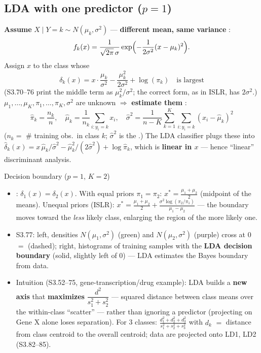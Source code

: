 \subsection{LDA with one predictor ($p=1$)}

\begin{keybox}[LDA, p = 1: model, discriminant function, estimates]
\textbf{Assume} $X\mid Y=k\sim N(\mu_k,\sigma^2)$ --- \textbf{different mean, same variance} :
\[ f_k(x)=\frac{1}{\sqrt{2\pi}\,\sigma}\exp\Bigl(-\frac{1}{2\sigma^2}(x-\mu_k)^2\Bigr). \]
Assign $x$ to the class whose 
\[ \delta_k(x)=x\cdot\frac{\mu_k}{\sigma^2}-\frac{\mu_k^2}{2\sigma^2}+\log(\pi_k)\quad\text{is largest} \]
{\footnotesize (S3.70--76 print the middle term as $\mu_k^2/\sigma^2$; the correct form, as in ISLR, has $2\sigma^2$.)}\\
$\mu_1,\dots,\mu_K,\pi_1,\dots,\pi_K,\sigma^2$ are unknown $\Rightarrow$ \textbf{estimate them} :
\[ \hat\pi_k=\frac{n_k}{n},\quad \hat\mu_k=\frac{1}{n_k}\sum_{i:y_i=k}x_i,\quad
\hat\sigma^2=\frac{1}{n-K}\sum_{k=1}^{K}\sum_{i:y_i=k}(x_i-\hat\mu_k)^2 \]
($n_k=$ \# training obs.\ in class $k$; $\hat\sigma^2$ is the .) The LDA classifier plugs these into
$\hat\delta_k(x)=x\,\hat\mu_k/\hat\sigma^2-\hat\mu_k^2/(2\hat\sigma^2)+\log\hat\pi_k$, which is
\textbf{linear in $x$} --- hence ``linear'' discriminant analysis.
\end{keybox}

\begin{topic}{Decision boundary ($p=1$, $K=2$)}
\,
\begin{itemize}
\item {}: $\delta_1(x)=\delta_2(x)$. With equal priors $\pi_1=\pi_2$:
  $x^*=\frac{\mu_1+\mu_2}{2}$ (midpoint of the means). Unequal priors (ISLR):
  $x^*=\frac{\mu_1+\mu_2}{2}+\frac{\sigma^2\log(\pi_2/\pi_1)}{\mu_1-\mu_2}$ --- the boundary moves toward the
  \emph{less} likely class, enlarging the region of the more likely one.
\item S3.77: left, densities $N(\mu_1,\sigma^2)$ (green) and $N(\mu_2,\sigma^2)$ (purple) cross at 0 $=$
   (dashed); right, histograms of training samples with the \textbf{LDA decision
  boundary} (solid, slightly left of 0) --- LDA estimates the Bayes boundary from data.
\item Intuition (S3.52--75, gene-transcription/drug example): LDA builds a \textbf{new axis} that
  \textbf{maximizes} $\dfrac{d^2}{s_1^2+s_2^2}$ --- squared distance between class means over the within-class
  ``scatter'' --- rather than ignoring a predictor (projecting on Gene X alone loses separation). For 3 classes:
  $\frac{d_1^2+d_2^2+d_3^2}{s_1^2+s_2^2+s_3^2}$ with $d_k$ $=$ distance from class centroid to the overall centroid;
  data are projected onto LD1, LD2 (S3.82--85).
\end{itemize}
\end{topic}

